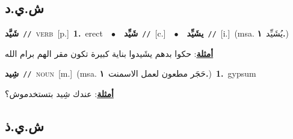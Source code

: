 \documentclass[10pt,a4paper,twoside]{article} %
\begin{document}
\begin{multicols}{2}
\vspace{-3mm}
\subsection*{\color{blue}\foreignlanguage{arabic}{ش.ي.د}\color{blue}{}} 

{\setlength\topsep{0pt}\textbf{\foreignlanguage{arabic}{شَيَّد}}\ {\color{gray}\texttt{//}\color{black}}\ \textsc{verb}\ [p.]\ \textbf{1.}~erect\ \ $\bullet$\ \ \setlength\topsep{0pt}\textbf{\foreignlanguage{arabic}{شَيِّد}}\ {\color{gray}\texttt{//}\color{black}}\ [c.]\ \ $\bullet$\ \ \setlength\topsep{0pt}\textbf{\foreignlanguage{arabic}{يشَيِّد}}\ {\color{gray}\texttt{//}\color{black}}\ [i.]\ \color{gray}(msa. \foreignlanguage{arabic}{يُشَيِّد}~\foreignlanguage{arabic}{\textbf{١.}})\color{black}\  \begin{flushright}\color{gray}\foreignlanguage{arabic}{\textbf{\underline{\foreignlanguage{arabic}{أمثلة}}}: حكوا بدهم يشَيدوا بناية كبيرة تكون مقر الهم برام الله}\end{flushright}\color{black}} \vspace{2mm}

{\setlength\topsep{0pt}\textbf{\foreignlanguage{arabic}{شِيد}}\ {\color{gray}\texttt{//}\color{black}}\ \textsc{noun}\ [m.]\ \color{gray}(msa. \foreignlanguage{arabic}{حَجَر مطعون لعمل الاسمنت}~\foreignlanguage{arabic}{\textbf{١.}})\color{black}\ \textbf{1.}~gypsum\  \begin{flushright}\color{gray}\foreignlanguage{arabic}{\textbf{\underline{\foreignlanguage{arabic}{أمثلة}}}: عندك شِيد بتستخدموش؟}\end{flushright}\color{black}} \vspace{2mm}

\vspace{-3mm}
\subsection*{\color{blue}\foreignlanguage{arabic}{ش.ي.ذ}\color{blue}{}} 


\end{multicols}
\end{document}
